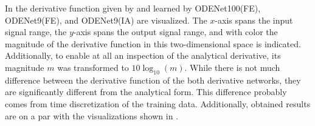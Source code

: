 In  the derivative function given by  and learned by ODENet100(FE), ODENet9(FE), and ODENet9(IA)  are visualized. The $x$-axis spans the input signal range, the $y$-axis spans the output signal range, and with color the magnitude of the derivative function in this two-dimensional space is indicated. Additionally, to enable at all an inspection of the analytical derivative, its magnitude $m$ was transformed to $10 \log_{10}(m)$. While there is not much difference between the derivative function of the both derivative networks, they are significantly different from the analytical form. This difference probably comes from time discretization of the training data. Additionally, obtained results are on a par with the visualizations shown in \cite{Parker2019}.
